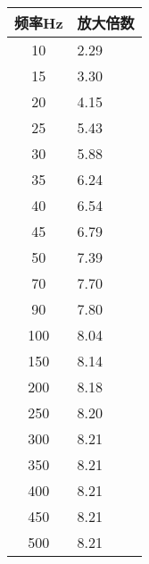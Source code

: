 \documentclass[dvipsnames, svgnames,a4paper,11pt]{article}
\begin{document}
		\begin{table}[ht]
			\centering
			\begin{multicols}{2} %
				\begin{tabularx}{\columnwidth}{|c|X|}
					\hline
					频率Hz & 放大倍数  \\
					\hline
					10 & 2.29  \\ \hline
					15 & 3.30  \\ \hline
					20 & 4.15  \\ \hline
					25 & 5.43  \\ \hline
					30 & 5.88  \\ \hline
					35 & 6.24  \\ \hline
					40 & 6.54  \\ \hline
					45 & 6.79  \\ \hline
					50 & 7.39  \\ \hline
					70 & 7.70  \\ \hline
					90 & 7.80  \\ \hline
					100 & 8.04  \\ \hline
					150 & 8.14  \\ \hline
					200 & 8.18  \\ \hline
					250 & 8.20  \\ \hline
					300 & 8.21  \\ \hline
					350 & 8.21  \\ \hline
					400 & 8.21  \\ \hline
					450 & 8.21  \\ \hline
					500 & 8.21  \\ \hline
				\end{tabularx}
				
				\columnbreak %
		

\end{multicols}
\end{table}
\end{document}
